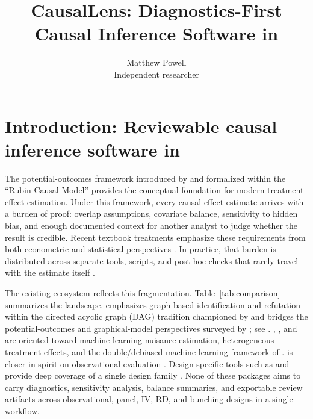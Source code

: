 \documentclass[article]{jss}
\author{Matthew Powell\\Independent researcher}
\title{CausalLens: Diagnostics-First Causal Inference Software in \proglang{Python}}
\begin{document}

\section[Introduction: Reviewable causal inference software in Python]{Introduction: Reviewable causal inference software in }\label{sec:intro}

The potential-outcomes framework introduced by \citet{Rubin1974} and
formalized within the ``Rubin Causal Model'' \citep{Holland1986} provides the
conceptual foundation for modern treatment-effect estimation. Under this
framework, every causal effect estimate arrives with a burden of proof:
overlap assumptions, covariate balance, sensitivity to hidden bias, and
enough documented context for another analyst to judge whether the result is
credible. Recent textbook treatments emphasize these requirements from both
econometric \citep{AngristPischke2009,Wooldridge2010,Cunningham2021} and
statistical perspectives
\citep{HernanRobins2020,HuntingtonKlein2022,Ding2024}. In practice, that
burden is distributed across separate tools, scripts, and post-hoc checks
that rarely travel with the estimate itself
\citep{Imbens2004,ImbensWooldridge2009,AtheyImbens2017,Peng2011,SandveEtAl2013,StoddenEtAl2016}.

The existing  ecosystem reflects this fragmentation.
Table~\ref{tab:comparison} summarizes the landscape.  emphasizes
graph-based identification and refutation within the directed acyclic graph
(DAG) tradition championed by \citet{Pearl2009} and bridges the
potential-outcomes and graphical-model perspectives surveyed by
\citet{Imbens2020}; see \citet{SharmaKiciman2020}.
, , and  are oriented toward
machine-learning nuisance estimation, heterogeneous treatment effects, and
the double/debiased machine-learning framework of
\citet{ChernozhukovEtAl2018}
\citep{BattocchiEtAl2019,BachEtAl2022,ChenEtAl2020}.  is
closer in spirit on observational evaluation \citep{ShimoniEtAl2019}.
Design-specific tools such as  and  provide deep
coverage of a single design family
\citep{CalonicoEtAl2015,MavrokonstantisLockwood2020}. None of these packages
aims to carry diagnostics, sensitivity analysis, balance summaries, and
exportable review artifacts across observational, panel, IV, RD, and bunching
designs in a single workflow.
\end{document}

